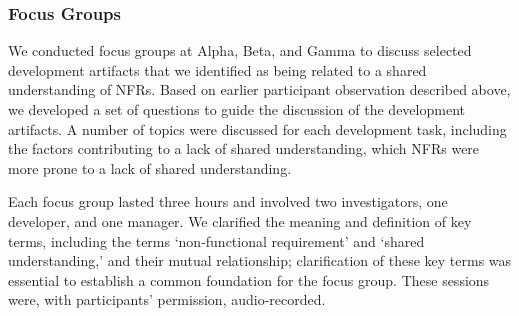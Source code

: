 \documentclass[smallextended]{svjour3}
\begin{document}
\subsubsection{Focus Groups}
We conducted focus groups at Alpha, Beta, and Gamma to discuss  
selected development artifacts that we identified as being related to a shared understanding of NFRs. 
Based on earlier participant observation described above, we developed a set of questions to guide the discussion of the development artifacts. 
A number of topics were discussed for each development task, including the factors contributing to a lack of shared understanding, which NFRs were more prone to a lack of shared understanding. 

Each focus group lasted three hours and involved two investigators, one developer, and one manager.
We clarified the meaning and definition of key terms, including the terms `non-functional requirement' and `shared understanding,'  
and their mutual relationship; clarification of these key terms was essential to establish a common foundation for the focus group.
These sessions were, with participants' permission, audio-recorded. 










\end{document}
